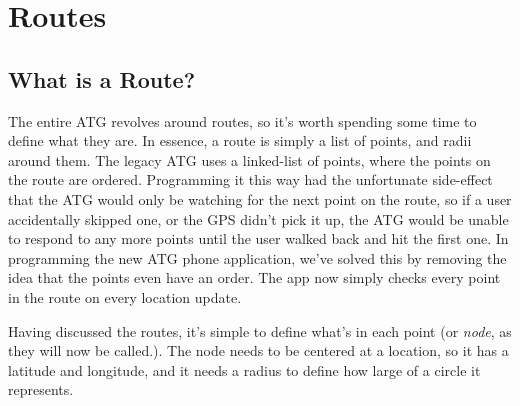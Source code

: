 \section{Routes}
\subsection{What is a Route?}
The entire ATG revolves around routes, so it's worth spending some time to define what they are. In essence, a route is simply a list of
points, and radii around them. The legacy ATG uses a linked-list of points, where the points on the route are ordered. Programming it this way
had the unfortunate side-effect that the ATG would only be watching for the next point on the route, so if a user accidentally skipped one,
or the GPS didn't pick it up, the ATG would be unable to respond to any more points until the user walked back and hit the first one.
In programming the new ATG phone application, we've solved this by removing the idea that the points even have an order. The app now simply
checks every point in the route on every location update.

Having discussed the routes, it's simple to define what's in each point (or \emph{node}, as they will now be called.). The node needs to be
centered at a location, so it has a latitude and longitude, and it needs a radius to define how large of a circle it represents.

